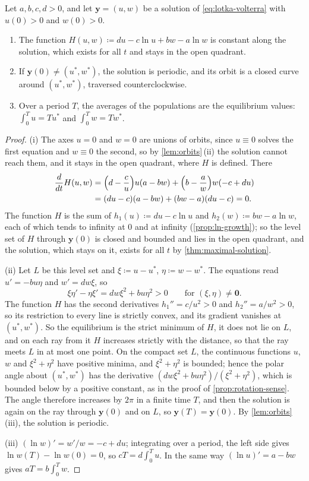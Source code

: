 \begin{proposition}
\label{prop:lotka-volterra}
Let $a,b,c,d>0$, and let $\mathbf y=(u,w)$ be a solution of \eqref{eq:lotka-volterra} with $u(0)>0$ and $w(0)>0$.
\begin{enumerate}
\item The function $H(u,w)\coloneqq du-c\ln u+bw-a\ln w$ is constant along the solution, which exists for all $t$ and stays in the open quadrant.
\item If $\mathbf y(0)\ne(u^*,w^*)$, the solution is periodic, and its orbit is a closed curve around $(u^*,w^*)$, traversed counterclockwise.
\item Over a period $T$, the averages of the populations are the equilibrium values: $\int_0^Tu=Tu^*$ and $\int_0^Tw=Tw^*$.
\end{enumerate}
\end{proposition}

\begin{proof}
(i) The axes $u=0$ and $w=0$ are unions of orbits, since $u\equiv0$ solves the first equation and $w\equiv0$ the second, so by \cref{lem:orbits}\,(ii) the solution cannot reach them, and it stays in the open quadrant, where $H$ is defined. There
\[
\begin{aligned}
\frac d{dt}H(u,w)&=\Bigl(d-\frac cu\Bigr)u(a-bw)+\Bigl(b-\frac aw\Bigr)w(-c+du)\\
&=(du-c)(a-bw)+(bw-a)(du-c)=0 .
\end{aligned}
\]
The function $H$ is the sum of $h_1(u)\coloneqq du-c\ln u$ and $h_2(w)\coloneqq bw-a\ln w$, each of which tends to infinity at $0$ and at infinity (\cref{prop:ln-growth}); so the level set of $H$ through $\mathbf y(0)$ is closed and bounded and lies in the open quadrant, and the solution, which stays on it, exists for all $t$ by \cref{thm:maximal-solution}.

(ii) Let $L$ be this level set and $\xi\coloneqq u-u^*$, $\eta\coloneqq w-w^*$. The equations read $u'=-bu\eta$ and $w'=dw\xi$, so
\[
\xi\eta'-\eta\xi'=dw\xi^2+bu\eta^2>0\qquad\text{for }(\xi,\eta)\ne\mathbf 0 .
\]
The function $H$ has the second derivatives $h_1''=c/u^2>0$ and $h_2''=a/w^2>0$, so its restriction to every line is strictly convex, and its gradient vanishes at $(u^*,w^*)$. So the equilibrium is the strict minimum of $H$, it does not lie on $L$, and on each ray from it $H$ increases strictly with the distance, so that the ray meets $L$ in at most one point. On the compact set $L$, the continuous functions $u$, $w$ and $\xi^2+\eta^2$ have positive minima, and $\xi^2+\eta^2$ is bounded; hence the polar angle about $(u^*,w^*)$ has the derivative $(dw\xi^2+bu\eta^2)/(\xi^2+\eta^2)$, which is bounded below by a positive constant, as in the proof of \cref{prop:rotation-sense}. The angle therefore increases by $2\pi$ in a finite time $T$, and then the solution is again on the ray through $\mathbf y(0)$ and on $L$, so $\mathbf y(T)=\mathbf y(0)$. By \cref{lem:orbits}\,(iii), the solution is periodic.

(iii) $(\ln w)'=w'/w=-c+du$; integrating over a period, the left side gives $\ln w(T)-\ln w(0)=0$, so $cT=d\int_0^Tu$. In the same way $(\ln u)'=a-bw$ gives $aT=b\int_0^Tw$.
\end{proof}


